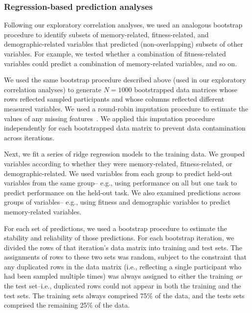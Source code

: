 \documentclass[10pt]{article}
\begin{document}
\subsubsection*{Regression-based prediction analyses}
Following our exploratory correlation analyses, we used an analogous
bootstrap procedure to identify subsets of memory-related,
fitness-related, and demographic-related variables that predicted
(non-overlapping) subsets of other variables.  For example, we tested
whether a combination of fitness-related variables could predict a
combination of memory-related variables, and so on.

We used the same bootstrap procedure described above (used in our
exploratory correlation analyses) to generate $N = 1000$ bootstrapped
data matrices whose rows reflected sampled participants and whose
columns reflected different measured variables.  We used a round-robin
imputation procedure to estimate the values of any missing
features~\citep{Buck60}.  We applied this imputation procedure
independently for each bootstrapped data matrix to prevent data
contamination across iterations.

Next, we fit a series of ridge regression models to the training data.
We grouped variables according to whether they were memory-related,
fitness-related, or demographic-related.  
We used variables from each group to predict held-out variables from
the same group-- e.g., using performance on all but one task to
predict performance on the held-out task.  We also examined
predictions across groups of variables-- e.g., using fitness and
demographic variables to predict memory-related variables.

For each set of predictions, we used a bootstrap procedure to estimate
the stability and reliability of those predictions.  For each bootstrap
iteration, we divided the rows of that iteration's data matrix into
training and test sets.  The assignments of rows to these two sets was
random, subject to the constraint that any duplicated rows in the data
matrix (i.e., reflecting a single participant who had been sampled
multiple times) was always assigned to either the training \textit{or}
the test set--i.e., duplicated rows could not appear in both the
training and the test sets.  The training sets always comprised 75\%
of the data, and the tests sets comprised the remaining 25\% of the
data.
\end{document}
